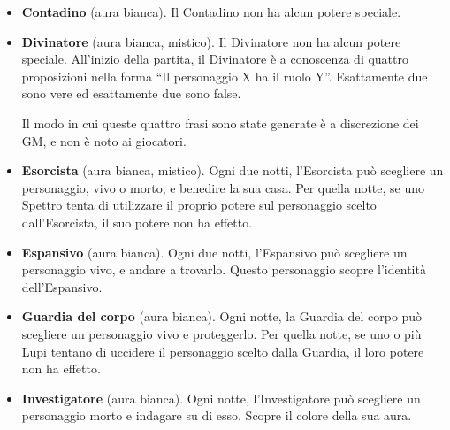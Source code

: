 \documentclass[a4paper,10pt]{article}
\begin{document}
\begin{itemize}
 \item {\bf Contadino} (aura bianca). Il Contadino non ha alcun potere speciale.

 
%  

 \item {\bf Divinatore} (aura bianca, mistico). Il Divinatore non ha alcun potere speciale. All'inizio della partita, il Divinatore è a conoscenza di quattro proposizioni nella forma ``Il personaggio X ha il ruolo Y''. Esattamente due sono vere ed esattamente due sono false.
 
 Il modo in cui queste quattro frasi sono state generate è a discrezione dei GM, e non è noto ai giocatori.

 \item {\bf Esorcista} (aura bianca, mistico). Ogni due notti, l'Esorcista può scegliere un personaggio, vivo o morto, e benedire la sua casa. Per quella notte, se uno Spettro tenta di utilizzare il proprio potere sul personaggio scelto dall'Esorcista, il suo potere non ha effetto.
 
 
 \item {\bf Espansivo} (aura bianca). Ogni due notti, l'Espansivo può scegliere un personaggio vivo, e andare a trovarlo. Questo personaggio scopre l'identità dell'Espansivo.

 \item {\bf Guardia del corpo} (aura bianca). Ogni notte, la Guardia del corpo può scegliere un personaggio vivo e proteggerlo. Per quella notte, se uno o più Lupi tentano di uccidere il personaggio scelto dalla Guardia, il loro potere non ha effetto.
 
 \item {\bf Investigatore} (aura bianca). Ogni notte, l'Investigatore può scegliere un personaggio morto e indagare su di esso. Scopre il colore della sua aura.


\end{itemize}
\end{document}
